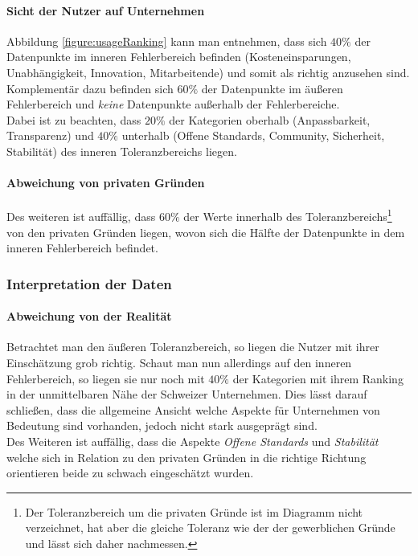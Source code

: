 \documentclass[a4paper]{article}
\begin{document}
                \paragraph{Sicht der Nutzer auf Unternehmen}
                    Abbildung \ref{figure:usageRanking} kann man entnehmen, dass sich $40\%$ der Datenpunkte im inneren Fehlerbereich befinden ({\scriptsize Kosteneinsparungen, Unabhängigkeit, Innovation, Mitarbeitende}) und somit als richtig anzusehen sind. Komplementär dazu befinden sich $60\%$ der Datenpunkte im äußeren Fehlerbereich und \emph{keine} Datenpunkte außerhalb der Fehlerbereiche.\\
                    Dabei ist zu beachten, dass $20\%$ der Kategorien oberhalb ({\scriptsize Anpassbarkeit, Transparenz}) und $40\%$ unterhalb ({\scriptsize Offene Standards, Community, Sicherheit, Stabilität}) des inneren Toleranzbereichs liegen.
                    
                \paragraph{Abweichung von privaten Gründen}
                    Des weiteren ist auffällig, dass $60\%$ der Werte innerhalb des Toleranzbereichs\footnote{Der Toleranzbereich um die privaten Gründe ist im Diagramm nicht verzeichnet, hat aber die gleiche Toleranz wie der der gewerblichen Gründe und lässt sich daher nachmessen.} von den privaten Gründen liegen, wovon sich die Hälfte der Datenpunkte in dem inneren Fehlerbereich befindet.
                               
            \subsubsection{Interpretation der Daten}
                \paragraph{Abweichung von der Realität}
                    Betrachtet man den äußeren Toleranzbereich, so liegen die Nutzer mit ihrer Einschätzung grob richtig. Schaut man nun allerdings auf den inneren Fehlerbereich, so liegen sie nur noch mit $40\%$ der Kategorien mit ihrem Ranking in der unmittelbaren Nähe der Schweizer Unternehmen. Dies lässt darauf schließen, dass die allgemeine Ansicht welche Aspekte für Unternehmen von Bedeutung sind vorhanden, jedoch nicht stark ausgeprägt sind.\\
                    Des Weiteren ist auffällig, dass die Aspekte \emph{Offene Standards} und \emph{Stabilität} welche sich in Relation zu den privaten Gründen in die richtige Richtung orientieren beide zu schwach eingeschätzt wurden. %
                    
\end{document}
